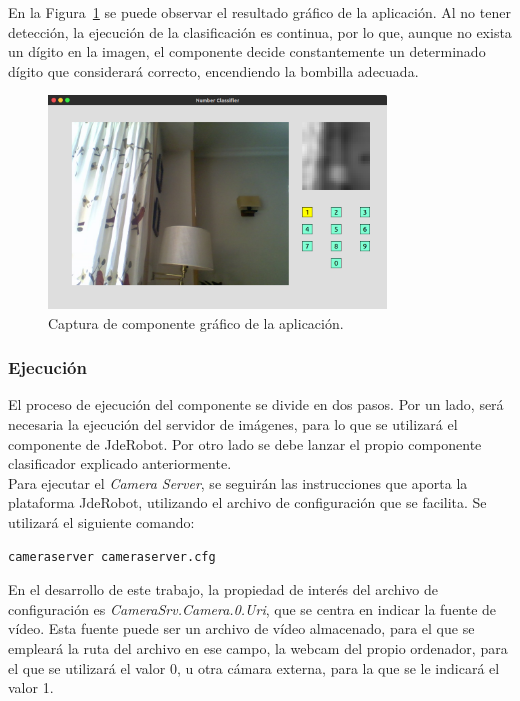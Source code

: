 En la Figura~\ref{fig.gui} se puede observar el resultado gráfico de la aplicación. Al no tener detección, la ejecución de la clasificación es continua, por lo que, aunque no exista un dígito en la imagen, el componente decide constantemente un determinado dígito que considerará correcto, encendiendo la bombilla adecuada.\\

\begin{figure}[H]
	\begin{center}
		\includegraphics[width=0.8\textwidth]{figures/gui}
		\caption{Captura de componente gráfico de la aplicación.}
		\label{fig.gui}
	\end{center}
\end{figure}

\subsubsection{Ejecución}
El proceso de ejecución del componente se divide en dos pasos. Por un lado, será necesaria la ejecución del servidor de imágenes, para lo que se utilizará el componente de JdeRobot. Por otro lado se debe lanzar el propio componente clasificador explicado anteriormente.\\

Para ejecutar el \textit{Camera Server}, se seguirán las instrucciones que aporta la plataforma JdeRobot, utilizando el archivo de configuración que se facilita. Se utilizará el siguiente comando: 
\vspace{10pt}
\begin{lstlisting}[frame=single]
	cameraserver cameraserver.cfg
\end{lstlisting}

En el desarrollo de este trabajo, la propiedad de interés del archivo de configuración es \textit{CameraSrv.Camera.0.Uri}, que se centra en indicar la fuente de vídeo. Esta fuente puede ser un archivo de vídeo almacenado, para el que se empleará la ruta del archivo en ese campo, la webcam del propio ordenador, para el que se utilizará el valor 0, u otra cámara externa, para la que se le indicará el valor 1.\\

